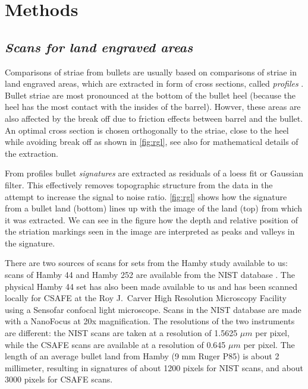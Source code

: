 \documentclass[12pt]{article}
\begin{document}
\hypertarget{methods}{%
\section*{Methods}\label{methods}}

\hypertarget{scans-for-land-engraved-areas}{%
\subsection*{\texorpdfstring{\emph{Scans for land engraved
areas}}{Scans for land engraved areas}}\label{scans-for-land-engraved-areas}}

Comparisons of striae from bullets are usually based on comparisons of
striae in land engraved areas, which are extracted in form of cross
sections, called \emph{profiles} \citep{aoas,ma2004}. Bullet striae are
most pronounced at the bottom of the bullet heel (because the heel has
the most contact with the insides of the barrel). Howver, these areas
are also affected by the break off due to friction effects between
barrel and the bullet. An optimal cross section is chosen orthogonally
to the striae, close to the heel while avoiding break off as shown in
\autoref{fig:rgl}, see also \citep{aoas} for mathematical details of the
extraction.

From profiles bullet \emph{signatures} \citep{chu2013,aoas} are
extracted as residuals of a loess fit or Gaussian filter. This
effectively removes topographic structure from the data in the attempt
to increase the signal to noise ratio. \autoref{fig:rgl} shows how the
signature from a bullet land (bottom) lines up with the image of the
land (top) from which it was extracted. We can see in the figure how the
depth and relative position of the striation markings seen in the image
are interpreted as peaks and valleys in the signature.

There are two sources of scans for sets from the Hamby study available
to us: scans of Hamby 44 and Hamby 252 are available from the NIST
database \citep{nist}. The physical Hamby 44 set has also been made
available to us and has been scanned locally for CSAFE at the Roy
J.~Carver High Resolution Microscopy Facility using a Sensofar confocal
light microscope. Scans in the NIST database are made with a NanoFocus
at 20x magnification. The resolutions of the two instruments are
different: the NIST scans are taken at a resolution of 1.5625 \(\mu m\)
per pixel, while the CSAFE scans are available at a resolution of 0.645
\(\mu m\) per pixel. The length of an average bullet land from Hamby (9
mm Ruger P85) is about 2 millimeter, resulting in signatures of about
1200 pixels for NIST scans, and about 3000 pixels for CSAFE scans.
\end{document}
